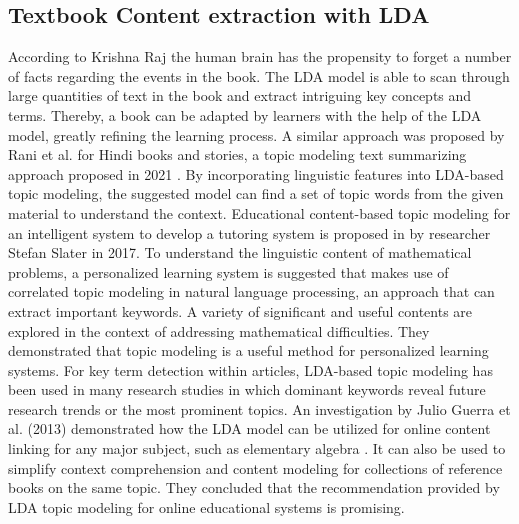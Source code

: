 \documentclass[sn-mathphys,Numbered]{sn-jnl}%
\theoremstyle{thmstyleone}%
\theoremstyle{thmstyletwo}%
\theoremstyle{thmstylethree}%
\begin{document}
\subsection{Textbook Content extraction with LDA}\label{Text_content_lda} 
According to Krishna Raj \cite{raj_p_m_sentiment_2022} the human brain has the propensity to forget a number of facts regarding the events in the book. The LDA model is able to scan through large quantities of text in the book and extract intriguing key concepts and terms. Thereby, a book can be adapted by learners with the help of the LDA model, greatly refining the learning process. A similar approach was proposed by Rani et al. for Hindi books and stories, a topic modeling text summarizing approach proposed in 2021 \cite{rani_extractive_2021}. By incorporating linguistic features into LDA-based topic modeling, the suggested model can find a set of topic words from the given material to understand the context. Educational content-based topic modeling for an intelligent system to develop a tutoring system is proposed in \cite{slater_using_2017} by researcher Stefan Slater in 2017. To understand the linguistic content of mathematical problems, a personalized learning system is suggested that makes use of correlated topic modeling in natural language processing, an approach that can extract important keywords. A variety of significant and useful contents are explored in the context of addressing mathematical difficulties. They demonstrated that topic modeling is a useful method for personalized learning systems. For key term detection within articles, LDA-based topic modeling has been used in many research studies in which dominant keywords reveal future research trends or the most prominent topics. An investigation by Julio Guerra et al. (2013) demonstrated how the LDA model can be utilized for online content linking for any major subject, such as elementary algebra \cite{guerra_when_2013}. It can also be used to simplify context comprehension and content modeling for collections of reference books on the same topic. They concluded that the recommendation provided by LDA topic modeling for online educational systems is promising.\\
\end{document}
